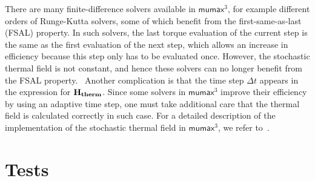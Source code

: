 \documentclass[10pt,a4paper]{article}
\newcommand{\mumax}{$\mathsf{mumax}^3$}
\begin{document}
There are many finite-difference solvers available in \mumax{}, for example different orders of Runge-Kutta solvers, some of which benefit from the first-same-as-last (FSAL) property. In such solvers, the last torque evaluation of the current step is the same as the first evaluation of the next step, which allows an increase in efficiency because this step only has to be evaluated once. However, the stochastic thermal field is not constant, and hence these solvers can no longer benefit from the FSAL property.~\cite{LEL-17b} Another complication is that the time step $\Delta t$ appears in the expression for $\vb{H_{therm}}$. Since some solvers in \mumax{} improve their efficiency by using an adaptive time step, one must take additional care that the thermal field is calculated correctly in such case. For a detailed description of the implementation of the stochastic thermal field in \mumax{}, we refer to~\cite{LEL-17b}.

\section{Tests}
\end{document}
